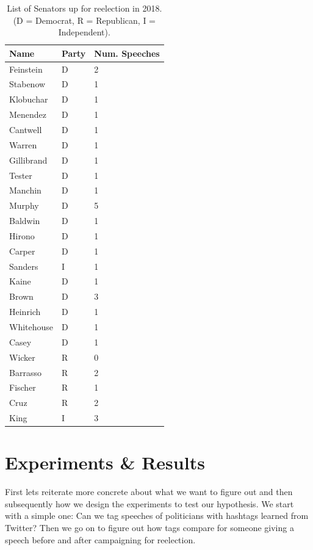 \documentclass[10pt,conference,compsocconf]{IEEEtran}
\begin{document}
\begin{table}[]
	\centering
	\begin{tabular}{@{}lll@{}}
		\toprule
		Name       & Party      & Num. Speeches \\ \midrule
		Feinstein  & D   &       2        \\
		Stabenow   & D   &       1        \\
		Klobuchar  & D   &     1          \\
		Menendez   & D   &     1          \\
		Cantwell   & D   &      1         \\
		Warren     & D   &   1            \\
		Gillibrand & D   &        1       \\
		Tester     & D   &     1          \\
		Manchin    & D   &      1         \\
		Murphy     & D   &     5          \\
		Baldwin    & D   &       1        \\
		Hirono     & D   &        1       \\
		Carper     & D   &      1         \\
		Sanders    & I   &      1         \\
		Kaine      & D   &         1      \\
		Brown      & D   &      3         \\
		Heinrich   & D   &       1        \\
		Whitehouse & D   &     1          \\
		Casey      & D   &     1          \\
		Wicker     & R &         0      \\
		Barrasso   & R &    2           \\
		Fischer    & R &         1      \\
		Cruz       & R &      2         \\
		King       & I &     3          \\ \bottomrule
	\end{tabular}
	\caption{List of Senators up for reelection in 2018. (D = Democrat, R = Republican, I = Independent).}
	\label{tbl:Senators}
\end{table}


\section{Experiments \& Results}
\label{sec:Experiments}
First lets reiterate more concrete about what we want to figure out and then subsequently how we design the experiments to test our hypothesis. 
We start with a simple one: Can we tag speeches of politicians with hashtags learned from Twitter? Then we go on to figure out how tags compare for someone giving a speech before and after campaigning for reelection. 
\end{document}
